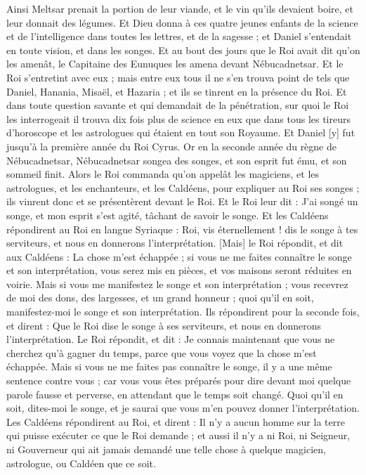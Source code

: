 \begin{multicols}{2}
Ainsi Meltsar prenait la portion de leur viande, et le vin qu'ils devaient boire, et leur donnait des légumes.
Et Dieu donna à ces quatre jeunes enfants de la science et de l'intelligence dans toutes les lettres, et de la sagesse ; et Daniel s'entendait en toute vision, et dans les songes.
Et au bout des jours que le Roi avait dit qu'on les amenât, le Capitaine des Eunuques les amena devant Nébucadnetsar.
Et le Roi s'entretint avec eux ; mais entre eux tous il ne s'en trouva point de tels que Daniel, Hanania, Misaël, et Hazaria ; et ils se tinrent en la présence du Roi.
Et dans toute question savante et qui demandait de la pénétration, sur quoi le Roi les interrogeait il trouva dix fois plus de science en eux que dans tous les tireurs d'horoscope et les astrologues qui étaient en tout son Royaume.
Et Daniel [y] fut jusqu'à la première année du Roi Cyrus.
\VerseOne{}Or en la seconde année du règne de Nébucadnetsar, Nébucadnetsar songea des songes, et son esprit fut ému, et son sommeil finit.
Alors le Roi commanda qu'on appelât les magiciens, et les astrologues, et les enchanteurs, et les Caldéens, pour expliquer au Roi ses songes ; ils vinrent donc et se présentèrent devant le Roi.
Et le Roi leur dit : J'ai songé un songe, et mon esprit s'est agité, tâchant de savoir le songe.
Et les Caldéens répondirent au Roi en langue Syriaque : Roi, vis éternellement ! dis le songe à tes serviteurs, et nous en donnerons l'interprétation.
[Mais] le Roi répondit, et dit aux Caldéens : La chose m'est échappée ; si vous ne me faites connaître le songe et son interprétation, vous serez mis en pièces, et vos maisons seront réduites en voirie.
Mais si vous me manifestez le songe et son interprétation ; vous recevrez de moi des dons, des largesses, et un grand honneur ; quoi qu'il en soit, manifestez-moi le songe et son interprétation.
Ils répondirent pour la seconde fois, et dirent : Que le Roi dise le songe à ses serviteurs, et nous en donnerons l'interprétation.
Le Roi répondit, et dit : Je connais maintenant que vous ne cherchez qu'à gagner du temps, parce que vous voyez que la chose m'est échappée.
Mais si vous ne me faites pas connaître le songe, il y a une même sentence contre vous ; car vous vous êtes préparés pour dire devant moi quelque parole fausse et perverse, en attendant que le temps soit changé. Quoi qu'il en soit, dites-moi le songe, et je saurai que vous m'en pouvez donner l'interprétation.
Les Caldéens répondirent au Roi, et dirent : Il n'y a aucun homme sur la terre qui puisse exécuter ce que le Roi demande ; et aussi il n'y a ni Roi, ni Seigneur, ni Gouverneur qui ait jamais demandé une telle chose à quelque magicien, astrologue, ou Caldéen que ce soit.

\end{multicols}
